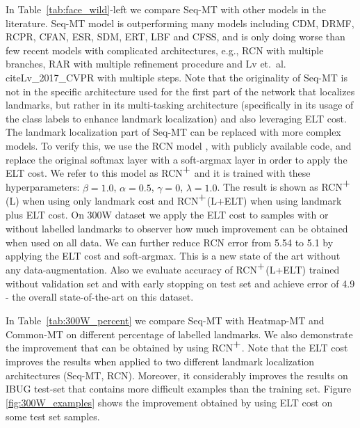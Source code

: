 \documentclass[10pt,twocolumn,letterpaper]{article}
\begin{document}
In Table~\ref{tab:face_wild}-left we compare Seq-MT with other models in the literature. Seq-MT model is outperforming many models including CDM, DRMF, RCPR, CFAN, ESR, SDM, ERT, LBF and CFSS, and is only doing worse than few recent models with complicated architectures, e.g., RCN \cite{honari2016recombinator} with multiple branches, RAR \cite{xiao2016robust} with multiple refinement procedure and Lv et.~al.\\cite{Lv_2017_CVPR} with multiple steps. 
Note that the originality of Seq-MT is not in the specific architecture used for the first part of the network that localizes landmarks, but rather in its multi-tasking architecture (specifically in its usage of the class labels to enhance landmark localization) and also leveraging ELT cost. The landmark localization part of Seq-MT can be replaced with more complex models. To verify this, we use the RCN model \cite{honari2016recombinator}, with publicly available code, and replace the original softmax layer with a soft-argmax layer in order to apply the ELT cost. We refer to this model as RCN$\stackanchor{+}{}$ and it is trained with these hyperparameters: $\beta = 1.0$, $\alpha = 0.5$, $\gamma = 0$, $\lambda = 1.0$. The result is shown as RCN$\stackanchor{+}{}$(L) when using only landmark cost and RCN$\stackanchor{+}{}$(L+ELT) when using landmark plus ELT cost. On 300W dataset we apply the ELT cost to samples with or without labelled landmarks to observer how much improvement can be obtained when used on all data. We can further reduce RCN error from 5.54 to 5.1 by applying the ELT cost and soft-argmax. This is a new state of the art without any data-augmentation. Also we evaluate accuracy of RCN$\stackanchor{+}{}$(L+ELT) trained without validation set and with early stopping on test set and achieve error of 4.9 - the overall state-of-the-art on this dataset. 

In Table~\ref{tab:300W_percent} we compare Seq-MT with Heatmap-MT and Common-MT 
on different percentage of labelled landmarks. We also demonstrate the improvement that can be obtained by using RCN$\stackanchor{+}{}$. Note that the ELT cost improves the results when applied to two different landmark localization architectures (Seq-MT, RCN). Moreover, it considerably improves the results on IBUG test-set that contains more difficult examples than the training set. Figure \ref{fig:300W_examples} shows the improvement obtained by using ELT cost on some test set samples.
\end{document}
